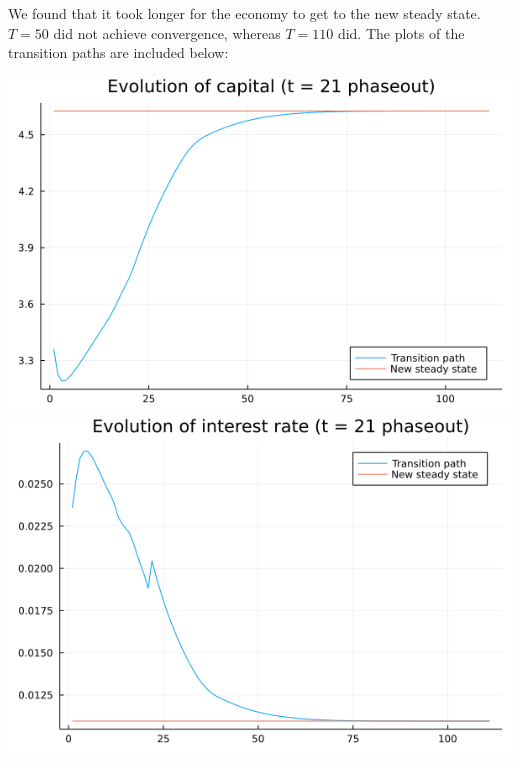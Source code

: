 \documentclass[12pt]{article}
\begin{document}
We found that it took longer for the economy to get to the new steady state. $T = 50$ did not achieve convergence, whereas $T = 110$ did. The plots of the transition paths are included below:
\begin{center}
    \includegraphics[scale= 0.35]{kplot_21.png}\includegraphics[scale= 0.35]{rplot_21.png}\\

\end{center}
\end{document}
